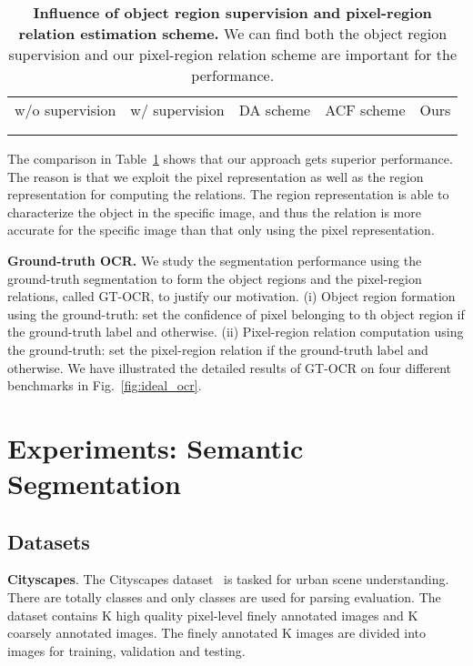 \documentclass[runningheads]{llncs}
\begin{document}
\renewcommand{\arraystretch}{1}
\begin{table}
\centering
\small
\caption{\small{
\textbf{Influence of object region supervision and pixel-region relation estimation scheme.}
We can find both the object region supervision
and our pixel-region relation scheme are important
for the performance.
}}
\resizebox{0.9\linewidth}{!}
{
\begin{tabular}{>{\centering\arraybackslash}p{2.5cm}|>{\centering\arraybackslash}p{2.5cm}|>{\centering\arraybackslash}p{2.5cm}|>{\centering\arraybackslash}p{2.5cm}|>{\centering\arraybackslash}p{2cm}}
    \shline
    \multicolumn{2}{c|}{Object region supervision} & \multicolumn{3}{c}{Pixel-region relations} \\
    \hline
    w/o supervision & w/ supervision & DA scheme  & ACF scheme & Ours \\ 
    \hline
     &  &  &   &  \\
    \shline
\end{tabular}
}
\label{table:pixel_region_relation}
\end{table}

The comparison in Table~\ref{table:pixel_region_relation}
shows that our approach gets superior performance.
The reason is that 
we exploit the pixel representation
as well as the region representation 
for computing the relations.
The region representation
is able to 
characterize the object 
in the specific image,
and thus the relation is more accurate
for the specific image
than that 
only using the pixel representation.

\noindent\textbf{Ground-truth OCR.}
We study the segmentation performance
using the ground-truth segmentation
to form the object regions and
the pixel-region relations, called GT-OCR,
to justify our motivation.
(i) Object region formation using the ground-truth: 
set the confidence of pixel  belonging to th object region 
 if the ground-truth label  and  otherwise.
(ii) Pixel-region relation computation using the ground-truth:
set the pixel-region relation  if the 
ground-truth label 
and  otherwise.
We have illustrated the detailed results of 
GT-OCR on four different benchmarks in Fig.~\ref{fig:ideal_ocr}.

\section{Experiments: Semantic Segmentation}

\subsection{Datasets}
\noindent\textbf{Cityscapes}. 
The Cityscapes dataset~\cite{cordts2016cityscapes} is tasked for urban scene understanding. 
There are totally
 classes 
and only  classes are used for parsing evaluation.
The dataset contains K high quality pixel-level finely annotated images and K coarsely annotated images. The finely annotated K images are divided into  images for training, validation and testing.
\end{document}
